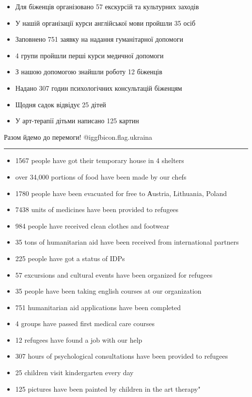 \begin{itemize}
  \item Для біженців організовано 57 екскурсій та культурних заходів
  \item У нашій організації курси англійської мови пройшли 35 осіб
  \item Заповнено 751 заявку на надання гуманітарної допомоги
  \item 4 групи пройшли перші курси медичної допомоги
  \item З нашою допомогою знайшли роботу 12 біженців
  \item Надано 307 годин психологічних консультацій біженцям
  \item Щодня садок відвідує 25 дітей
  \item У арт-терапії дітьми написано 125 картин
\end{itemize}

Разом йдемо до перемоги! @igg{fbicon.flag.ukraina}

\vspace{5pt}
\par\noindent\rule{0.5\textwidth}{0.4pt}
\vspace{5pt}

\begin{itemize}
  \item 1567 people have got their temporary house in 4 shelters
  \item over 34,000 portions of food have been made by our chefs
  \item 1780 people have been evacuated for free to Аustria, Lithuania, Poland
  \item 7438 units of medicines have been provided to refugees
  \item 984 people have received clean clothes and footwear
  \item 35 tons of humanitarian aid have been received from international partners
  \item 225 people have got a status of IDPs
  \item 57 excursions and cultural events have been organized for refugees
  \item 35 people have been taking english courses at our organization
  \item 751 humanitarian aid applications have been completed
  \item 4 groups have passed first medical care courses
  \item 12 refugees have found a job with our help
  \item 307 hours of psychological consultations have been provided to refugees
  \item 25 children visit kindergarten every day
  \item 125 pictures have been painted by children in the art therapy"
\end{itemize}
